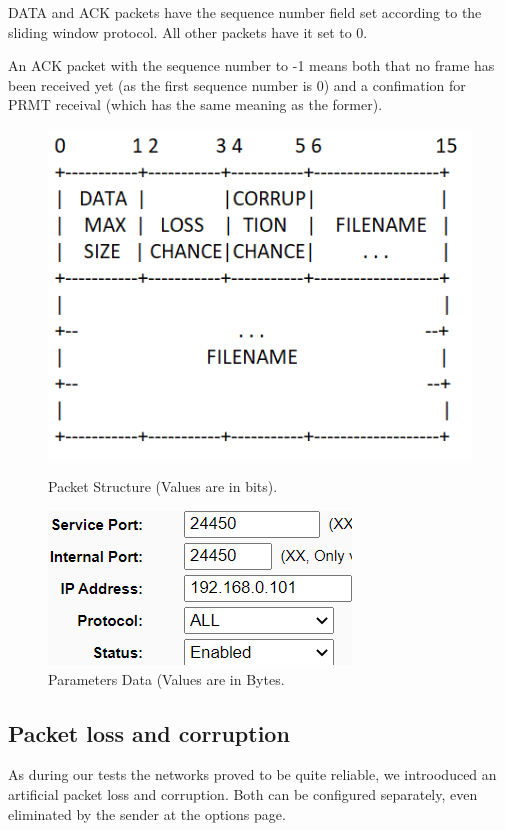 \documentclass[12pt]{article}
\begin{document}
DATA and ACK packets have the sequence number field set according to the sliding window protocol. All other packets have it set to 0.

An ACK packet with the sequence number to -1 means both that no frame has been received yet (as the first sequence number is 0) and a confimation for PRMT receival (which has the same meaning as the former).

\begin{figure}[!htb]
	\begin{minipage}{0.48\textwidth}
		\centering
		\includegraphics[width=.7\linewidth]{ParametersStructure.png}
		\caption{Packet Structure (Values are in bits).}\label{fig:fig8}
	\end{minipage}\hfill
	\begin{minipage}{0.48\textwidth}
		\centering
		\includegraphics[width=.7\linewidth]{PortForward.png}
		\caption{Parameters Data (Values are in Bytes.}\label{fig:fig9}
	\end{minipage}\hfill
\end{figure}

\subsection{Packet loss and corruption}

As during our tests the networks proved to be quite reliable, we introoduced an artificial packet loss and corruption. Both can be configured separately, even eliminated by the sender at the options page.
\end{document}
